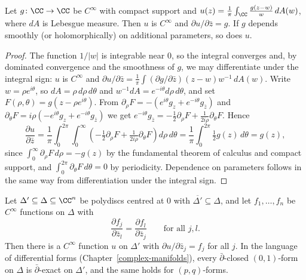 \begin{lemma}\label{several-complex-variables:lemma-cauchy-transform}
Let $g \colon \CC \to \CC$ be $C^\infty$ with compact support and $u(z) = \frac{1}{\pi}\int_\CC\frac{g(z - w)}{w}\,dA(w)$, where $dA$ is Lebesgue measure. Then $u$ is $C^\infty$ and
$\partial u/\partial\bar z = g$. If $g$ depends smoothly (or holomorphically) on additional parameters, so does $u$.
\end{lemma}

\begin{proof}
The function $1/|w|$ is integrable near $0$, so the integral converges and, by dominated convergence and the smoothness of $g$, we may differentiate under the integral sign: $u$ is $C^\infty$ and
$\partial u/\partial\bar z = \frac1\pi\int(\partial g/\partial\bar z)(z - w)w^{-1}\,dA(w)$. Write $w = \rho e^{i\theta}$, so $dA = \rho\,d\rho\,d\theta$ and $w^{-1}dA = e^{-i\theta}d\rho\,d\theta$, and set
$F(\rho, \theta) = g(z - \rho e^{i\theta})$. From $\partial_\rho F = -(e^{i\theta}g_z + e^{-i\theta}g_{\bar z})$ and $\partial_\theta F = i\rho(-e^{i\theta}g_z + e^{-i\theta}g_{\bar z})$ we get
$e^{-i\theta}g_{\bar z} = -\tfrac12\partial_\rho F + \tfrac{1}{2i\rho}\partial_\theta F$. Hence
\[
\frac{\partial u}{\partial\bar z} = \frac1\pi\int_0^{2\pi}\int_0^\infty\left(-\tfrac12\partial_\rho F + \tfrac{1}{2i\rho}\partial_\theta F\right)d\rho\,d\theta = \frac1\pi\int_0^{2\pi}\tfrac12 g(z)\,d\theta = g(z),
\]
since $\int_0^\infty\partial_\rho F\,d\rho = -g(z)$ by the fundamental theorem of calculus and compact support, and $\int_0^{2\pi}\partial_\theta F\,d\theta = 0$ by periodicity. Dependence on parameters
follows in the same way from differentiation under the integral sign.
\end{proof}

\begin{theorem}\label{several-complex-variables:theorem-dbar-poincare}
Let $\Delta' \subseteq \Delta \subseteq \CC^n$ be polydiscs centred at $0$ with $\overline{\Delta'} \subseteq \Delta$, and let $f_1, \ldots, f_n$ be $C^\infty$ functions on $\Delta$ with
\[
\frac{\partial f_j}{\partial\bar z_l} = \frac{\partial f_l}{\partial\bar z_j} \qquad \text{for all } j, l.
\]
Then there is a $C^\infty$ function $u$ on $\Delta'$ with $\partial u/\partial\bar z_j = f_j$ for all $j$. In the language of differential forms (Chapter~\ref{complex-manifolds}), every $\bar\partial$-closed
$(0,1)$-form on $\Delta$ is $\bar\partial$-exact on $\Delta'$, and the same holds for $(p, q)$-forms.
\end{theorem}

